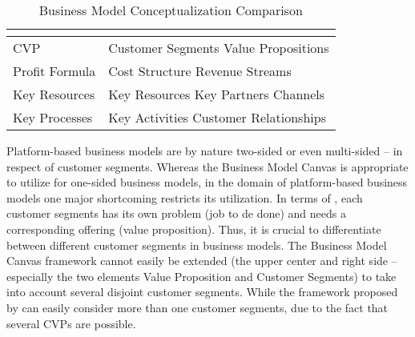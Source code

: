 \begin{table}[h]
	\centering
	\begin{tabular}{lp{}}
			\citet{Johnson2008} & \citet{Osterwalder2010}\\ \hline
			\ac{CVP}	& Customer Segments \newline Value Propositions\\ \hline
			Profit Formula	& Cost Structure \newline	Revenue Streams\\ \hline
			Key Resources	& Key Resources \newline Key Partners \newline Channels\\ \hline
			Key Processes	& Key Activities \newline	Customer Relationships
	\end{tabular}
	\caption{Business Model Conceptualization Comparison}
	\label{tab:bmcc}
\end{table}

Platform-based business models are by nature two-sided or even multi-sided -- in respect of customer segments. Whereas the Business Model Canvas is appropriate to utilize for one-sided business models, in the domain of platform-based business models one major shortcoming restricts its utilization. In terms of \citet{Johnson2008}, each customer segments has its own problem (job to de done) and needs a corresponding offering (value proposition). Thus, it is crucial to differentiate between different customer segments in business models. The Business Model Canvas framework cannot easily be extended (the upper center and right side -- especially the two elements Value Proposition and Customer Segments) to take into account several disjoint customer segments. While the framework proposed by \citet{Johnson2008} can easily consider more than one customer segments, due to the fact that several \acp{CVP} are possible.


